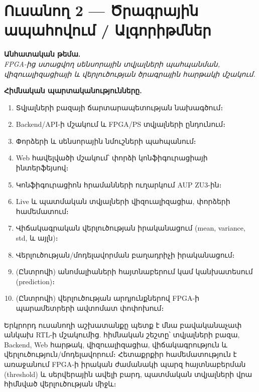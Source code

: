 \chapter{Ուսանող 2 — Ծրագրային ապահովում / Ալգորիթմներ}

\textbf{Անհատական թեմա.}\\
\emph{FPGA-ից ստացվող սենսորային տվյալների պահպանման, վիզուալիզացիայի և վերլուծության
ծրագրային հարթակի մշակում.}

\textbf{Հիմնական պարտականությունները.}
\begin{enumerate}[leftmargin=1.6em]
  \item Տվյալների բազայի ճարտարապետության նախագծում։
  \item Backend/API-ի մշակում և FPGA/PS տվյալների ընդունում։
  \item Փորձերի և սենսորային նմուշների պահպանում։
  \item Web հավելվածի մշակում՝ փորձի կոնֆիգուրացիայի ինտերֆեյսով։
  \item Կոնֆիգուրացիոն հրամանների ուղարկում AUP ZU3-ին։
  \item Live և պատմական տվյալների վիզուալիզացիա, փորձերի համեմատում։
  \item Վիճակագրական վերլուծության իրականացում (mean, variance, std, և այլն)։
  \item Վերլուծության/մոդելավորման բաղադրիչի իրականացում։
  \item (Ընտրովի) անոմալիաների հայտնաբերում կամ կանխատեսում (prediction)։
  \item (Ընտրովի) վերլուծության արդյունքներով FPGA-ի պարամետրերի ավտոմատ փոփոխում։
\end{enumerate}

Երկրորդ ուսանողի աշխատանքը պետք է մնա բավականաչափ անկախ RTL-ի մշակումից. հիմնական
շեշտը՝ տվյալների բազա, Backend, Web հարթակ, վիզուալիզացիա, վիճակագրություն և
վերլուծություն/մոդելավորում։ Հետաքրքիր համեմատություն է առաջանում FPGA-ի իրական
ժամանակի պարզ հայտնաբերման (threshold) և սերվերային ավելի բարդ, պատմական տվյալների
վրա հիմնված վերլուծության միջև։
